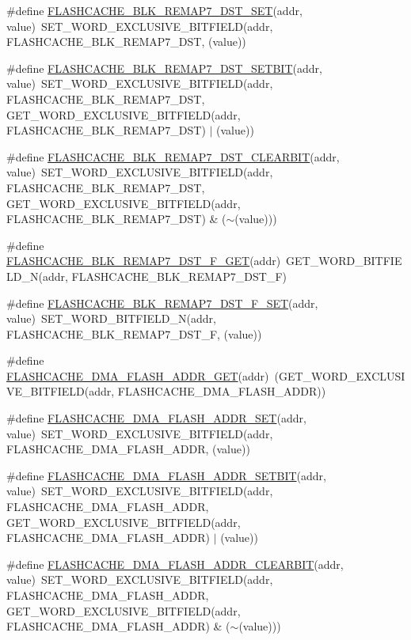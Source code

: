 \begin{DoxyCompactItemize}
\item 
\#define \hyperlink{a00549_a5ff9c05b2fd4c98889c90b702cff0aff}{FLASHCACHE\_\-BLK\_\-REMAP7\_\-DST\_\-SET}(addr, value)~SET\_\-WORD\_\-EXCLUSIVE\_\-BITFIELD(addr, FLASHCACHE\_\-BLK\_\-REMAP7\_\-DST, (value))
\item 
\#define \hyperlink{a00549_a71ca1c4db4dd9fdac70221d4783336a5}{FLASHCACHE\_\-BLK\_\-REMAP7\_\-DST\_\-SETBIT}(addr, value)~SET\_\-WORD\_\-EXCLUSIVE\_\-BITFIELD(addr, FLASHCACHE\_\-BLK\_\-REMAP7\_\-DST, GET\_\-WORD\_\-EXCLUSIVE\_\-BITFIELD(addr, FLASHCACHE\_\-BLK\_\-REMAP7\_\-DST) $|$ (value))
\item 
\#define \hyperlink{a00549_ad83f73123c294282dfcb667e1b099642}{FLASHCACHE\_\-BLK\_\-REMAP7\_\-DST\_\-CLEARBIT}(addr, value)~SET\_\-WORD\_\-EXCLUSIVE\_\-BITFIELD(addr, FLASHCACHE\_\-BLK\_\-REMAP7\_\-DST, GET\_\-WORD\_\-EXCLUSIVE\_\-BITFIELD(addr, FLASHCACHE\_\-BLK\_\-REMAP7\_\-DST) \& ($\sim$(value)))
\item 
\#define \hyperlink{a00549_ab1ca038e85294461fe55eedf5d58a633}{FLASHCACHE\_\-BLK\_\-REMAP7\_\-DST\_\-F\_\-GET}(addr)~GET\_\-WORD\_\-BITFIELD\_\-N(addr, FLASHCACHE\_\-BLK\_\-REMAP7\_\-DST\_\-F)
\item 
\#define \hyperlink{a00549_ae494c96d7be16e2d94a3c0ca82aca7e3}{FLASHCACHE\_\-BLK\_\-REMAP7\_\-DST\_\-F\_\-SET}(addr, value)~SET\_\-WORD\_\-BITFIELD\_\-N(addr, FLASHCACHE\_\-BLK\_\-REMAP7\_\-DST\_\-F, (value))
\item 
\#define \hyperlink{a00549_a6210f28616d4dbc7073587f61222c7df}{FLASHCACHE\_\-DMA\_\-FLASH\_\-ADDR\_\-GET}(addr)~(GET\_\-WORD\_\-EXCLUSIVE\_\-BITFIELD(addr, FLASHCACHE\_\-DMA\_\-FLASH\_\-ADDR))
\item 
\#define \hyperlink{a00549_a74dbef16cd5e3de869e0ba3eed7504d1}{FLASHCACHE\_\-DMA\_\-FLASH\_\-ADDR\_\-SET}(addr, value)~SET\_\-WORD\_\-EXCLUSIVE\_\-BITFIELD(addr, FLASHCACHE\_\-DMA\_\-FLASH\_\-ADDR, (value))
\item 
\#define \hyperlink{a00549_aea0ce453ac30173dee254896a061232c}{FLASHCACHE\_\-DMA\_\-FLASH\_\-ADDR\_\-SETBIT}(addr, value)~SET\_\-WORD\_\-EXCLUSIVE\_\-BITFIELD(addr, FLASHCACHE\_\-DMA\_\-FLASH\_\-ADDR, GET\_\-WORD\_\-EXCLUSIVE\_\-BITFIELD(addr, FLASHCACHE\_\-DMA\_\-FLASH\_\-ADDR) $|$ (value))
\item 
\#define \hyperlink{a00549_aa8914b27505e8ccab8a20cabaab7a916}{FLASHCACHE\_\-DMA\_\-FLASH\_\-ADDR\_\-CLEARBIT}(addr, value)~SET\_\-WORD\_\-EXCLUSIVE\_\-BITFIELD(addr, FLASHCACHE\_\-DMA\_\-FLASH\_\-ADDR, GET\_\-WORD\_\-EXCLUSIVE\_\-BITFIELD(addr, FLASHCACHE\_\-DMA\_\-FLASH\_\-ADDR) \& ($\sim$(value)))

\end{DoxyCompactItemize}
